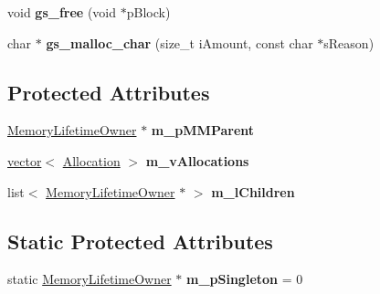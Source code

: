 \begin{DoxyCompactItemize}
\item 
\hypertarget{classgeneral__server_1_1MemoryLifetimeOwner_af1c8e66a17137d30c3656ea6dd4751f6}{void {\bfseries gs\-\_\-free} (void $\ast$p\-Block)}\label{classgeneral__server_1_1MemoryLifetimeOwner_af1c8e66a17137d30c3656ea6dd4751f6}

\item 
\hypertarget{classgeneral__server_1_1MemoryLifetimeOwner_a655d5a0128925e36b203c146f6ebd709}{char $\ast$ {\bfseries gs\-\_\-malloc\-\_\-char} (size\-\_\-t i\-Amount, const char $\ast$s\-Reason)}\label{classgeneral__server_1_1MemoryLifetimeOwner_a655d5a0128925e36b203c146f6ebd709}

\end{DoxyCompactItemize}
\subsection*{\-Protected \-Attributes}
\begin{DoxyCompactItemize}
\item 
\hypertarget{classgeneral__server_1_1MemoryLifetimeOwner_aece47b6a736d438e8618671023e52d52}{\hyperlink{classgeneral__server_1_1MemoryLifetimeOwner}{\-Memory\-Lifetime\-Owner} $\ast$ {\bfseries m\-\_\-p\-M\-M\-Parent}}\label{classgeneral__server_1_1MemoryLifetimeOwner_aece47b6a736d438e8618671023e52d52}

\item 
\hypertarget{classgeneral__server_1_1MemoryLifetimeOwner_a45865566db219344575afaa8df9292d5}{\hyperlink{classvector}{vector}$<$ \hyperlink{structgeneral__server_1_1MemoryLifetimeOwner_1_1Allocation}{\-Allocation} $>$ {\bfseries m\-\_\-v\-Allocations}}\label{classgeneral__server_1_1MemoryLifetimeOwner_a45865566db219344575afaa8df9292d5}

\item 
\hypertarget{classgeneral__server_1_1MemoryLifetimeOwner_a3b106e790f249c817c03c64c7a86042e}{list$<$ \hyperlink{classgeneral__server_1_1MemoryLifetimeOwner}{\-Memory\-Lifetime\-Owner} $\ast$ $>$ {\bfseries m\-\_\-l\-Children}}\label{classgeneral__server_1_1MemoryLifetimeOwner_a3b106e790f249c817c03c64c7a86042e}

\end{DoxyCompactItemize}
\subsection*{\-Static \-Protected \-Attributes}
\begin{DoxyCompactItemize}
\item 
\hypertarget{classgeneral__server_1_1MemoryLifetimeOwner_a3f2349fa61f8b19235384f6127e53c68}{static \hyperlink{classgeneral__server_1_1MemoryLifetimeOwner}{\-Memory\-Lifetime\-Owner} $\ast$ {\bfseries m\-\_\-p\-Singleton} = 0}\label{classgeneral__server_1_1MemoryLifetimeOwner_a3f2349fa61f8b19235384f6127e53c68}

\end{DoxyCompactItemize}
